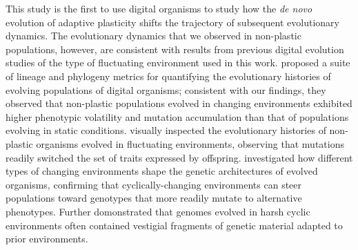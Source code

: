 This study is the first to use digital organisms to study how the \textit{de novo} evolution of adaptive plasticity shifts the trajectory of subsequent evolutionary dynamics.
The evolutionary dynamics that we observed in non-plastic populations, however, are consistent with results from previous digital evolution studies of the type of fluctuating environment used in this work.
\cite{dolson_interpreting_2020} proposed a suite of lineage and phylogeny metrics for quantifying the evolutionary histories of evolving populations of digital organisms; consistent with our findings, they observed that non-plastic populations evolved in changing environments exhibited higher phenotypic volatility and mutation accumulation than that of populations evolving in static conditions.
\cite{lalejini_evolutionary_2016} visually inspected the evolutionary histories of non-plastic organisms evolved in fluctuating environments, observing that mutations readily switched the set of traits expressed by offspring.
\cite{canino-koning_evolution_2016} investigated how different types of changing environments shape the genetic architectures of evolved organisms, confirming that cyclically-changing environments can steer populations toward genotypes that more readily mutate to alternative phenotypes.
Further \cite{canino-koning_evolution_2016} domonstrated that genomes evolved in harsh cyclic environments often contained vestigial fragments of genetic material adapted to prior environments.





